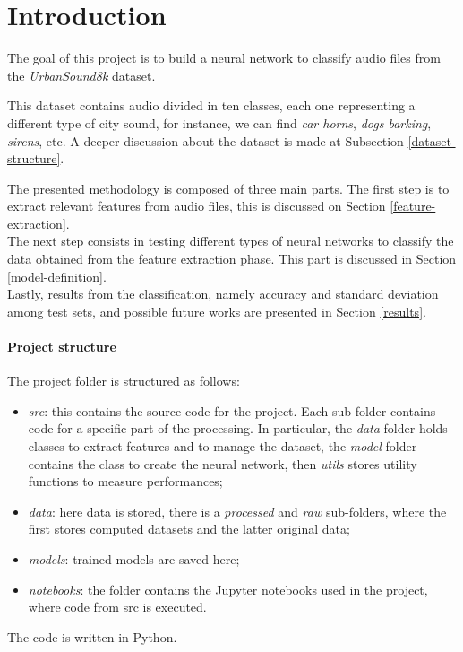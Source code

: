 \section{Introduction}

The goal of this project is to build a neural network to classify audio 
files from the \emph{UrbanSound8k} dataset.~\cite{dataset}

This dataset contains audio divided in ten classes, each one representing 
a different type of city sound, for instance, we can find \emph{car horns}, 
\emph{dogs barking}, \emph{sirens}, etc. A deeper discussion about 
the dataset is made at Subsection \vref*{dataset-structure}.

The presented methodology is composed of three main parts.
The first step is to extract relevant features from audio files, 
this is discussed on Section \vref*{feature-extraction}.\\
The next step consists in testing different types of neural networks
to classify the data obtained from the feature extraction phase. This part is
discussed in Section \vref*{model-definition}.\\
Lastly, results from the classification, namely accuracy 
and standard deviation among test sets, and possible future works 
are presented in Section \vref*{results}.

\paragraph{Project structure}

The project folder is structured as follows:
\begin{itemize}
    \item \emph{src}: this contains the source code for the
    project. Each sub-folder contains code for a specific part of the 
    processing. In particular, the \emph{data} folder holds classes to 
    extract features and to manage the dataset, the \emph{model} folder
    contains the class to create the neural network, then \emph{utils} 
    stores utility functions to measure performances;
    \item \emph{data}: here data is stored, there is a \emph{processed}
    and \emph{raw} sub-folders, where the first stores computed datasets 
    and the latter original data;
    \item \emph{models}: trained models are saved here;
    \item \emph{notebooks}: the folder contains the Jupyter notebooks 
    used in the project, where code from src is executed.
\end{itemize}
The code is written in Python.
\newpage